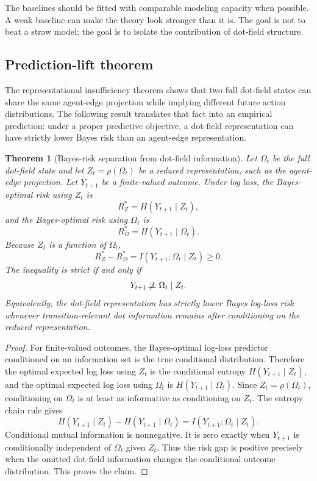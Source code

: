 \documentclass[11pt]{article}
\newtheorem{theorem}{Theorem}
\theoremstyle{remark}
\begin{document}
The baselines should be fitted with comparable modeling capacity when possible.
A weak baseline can make the theory look stronger than it is. The goal is not to
beat a straw model; the goal is to isolate the contribution of dot-field
structure.

\subsection{Prediction-lift theorem}\label{prediction-lift-theorem}

The representational insufficiency theorem shows that two full dot-field states
can share the same agent-edge projection while implying different future action
distributions. The following result translates that fact into an empirical
prediction: under a proper predictive objective, a dot-field representation can
have strictly lower Bayes risk than an agent-edge representation.

\begin{theorem}[Bayes-risk separation from dot-field information]\label{thm:bayes-risk-separation}
Let \(\Omega_t\) be the full dot-field state and let
\(Z_t=\rho(\Omega_t)\) be a reduced representation, such as the agent-edge
projection. Let \(Y_{t+1}\) be a finite-valued outcome. Under log loss, the
Bayes-optimal risk using \(Z_t\) is
\[
R_Z^*=H(Y_{t+1}\mid Z_t),
\]
and the Bayes-optimal risk using \(\Omega_t\) is
\[
R_\Omega^*=H(Y_{t+1}\mid \Omega_t).
\]
Because \(Z_t\) is a function of \(\Omega_t\),
\[
R_Z^*-R_\Omega^*=I(Y_{t+1};\Omega_t\mid Z_t)\geq 0.
\]
The inequality is strict if and only if
\[
Y_{t+1}\not\!\perp\!\!\!\perp \Omega_t\mid Z_t.
\]
Equivalently, the dot-field representation has strictly lower Bayes log-loss
risk whenever transition-relevant dot information remains after conditioning on
the reduced representation.
\end{theorem}

\begin{proof}
For finite-valued outcomes, the Bayes-optimal log-loss predictor conditioned on
an information set is the true conditional distribution. Therefore the optimal
expected log loss using \(Z_t\) is the conditional entropy
\(H(Y_{t+1}\mid Z_t)\), and the optimal expected log loss using \(\Omega_t\) is
\(H(Y_{t+1}\mid \Omega_t)\). Since \(Z_t=\rho(\Omega_t)\), conditioning on
\(\Omega_t\) is at least as informative as conditioning on \(Z_t\). The entropy
chain rule gives
\[
H(Y_{t+1}\mid Z_t)-H(Y_{t+1}\mid \Omega_t)
=I(Y_{t+1};\Omega_t\mid Z_t).
\]
Conditional mutual information is nonnegative. It is zero exactly when
\(Y_{t+1}\) is conditionally independent of \(\Omega_t\) given \(Z_t\). Thus the
risk gap is positive precisely when the omitted dot-field information changes
the conditional outcome distribution. This proves the claim.
\end{proof}
\end{document}
